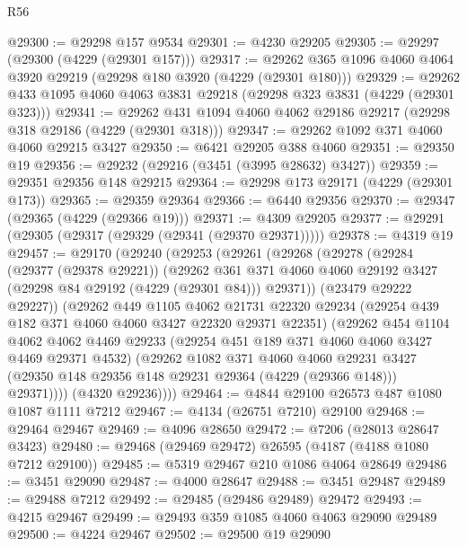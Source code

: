 \begin{lexlean}{R56}
\begin{coremodule}
@29300 := @29298 @157 @9534
@29301 := @4230 @29205
@29305 := @29297 (@29300 (@4229 (@29301 @157)))
@29317 := @29262 @365 @1096 @4060 @4064 @3920 @29219 (@29298 @180 @3920 (@4229 (@29301 @180)))
@29329 := @29262 @433 @1095 @4060 @4063 @3831 @29218 (@29298 @323 @3831 (@4229 (@29301 @323)))
@29341 := @29262 @431 @1094 @4060 @4062 @29186 @29217 (@29298 @318 @29186 (@4229 (@29301 @318)))
@29347 := @29262 @1092 @371 @4060 @4060 @29215 @3427
@29350 := @6421 @29205 @388 @4060
@29351 := @29350 @19
@29356 := @29232 (@29216 (@3451 (@3995 @28632) @3427))
@29359 := @29351 @29356 @148 @29215
@29364 := @29298 @173 @29171 (@4229 (@29301 @173))
@29365 := @29359 @29364
@29366 := @6440 @29356
@29370 := @29347 (@29365 (@4229 (@29366 @19)))
@29371 := @4309 @29205
@29377 := @29291 (@29305 (@29317 (@29329 (@29341 (@29370 @29371)))))
@29378 := @4319 @19
@29457 := @29170
    (@29240
      (@29253
        (@29261
          (@29268
            (@29278
              (@29284
                (@29377 (@29378 @29221))
                (@29262
                  @361
                  @371
                  @4060
                  @4060
                  @29192
                  @3427
                  (@29298 @84 @29192 (@4229 (@29301 @84)))
                  @29371))
              (@23479 @29222 @29227))
            (@29262
              @449
              @1105
              @4062
              @21731
              @22320
              @29234
              (@29254 @439 @182 @371 @4060 @4060 @3427 @22320 @29371 @22351)
              (@29262
                @454
                @1104
                @4062
                @4062
                @4469
                @29233
                (@29254 @451 @189 @371 @4060 @4060 @3427 @4469 @29371 @4532)
                (@29262
                  @1082
                  @371
                  @4060
                  @4060
                  @29231
                  @3427
                  (@29350 @148 @29356 @148 @29231 @29364 (@4229 (@29366 @148)))
                  @29371))))
          (@4320 @29236))))
@29464 := @4844 @29100 @26573 @487 @1080 @1087 @1111 @7212
@29467 := @4134 (@26751 @7210) @29100
@29468 := @29464 @29467
@29469 := @4096 @28650
@29472 := @7206 (@28013 @28647 @3423)
@29480 := @29468 (@29469 @29472) @26595 (@4187 (@4188 @1080 @7212 @29100))
@29485 := @5319 @29467 @210 @1086 @4064 @28649
@29486 := @3451 @29090
@29487 := @4000 @28647
@29488 := @3451 @29487
@29489 := @29488 @7212
@29492 := @29485 (@29486 @29489) @29472
@29493 := @4215 @29467
@29499 := @29493 @359 @1085 @4060 @4063 @29090 @29489
@29500 := @4224 @29467
@29502 := @29500 @19 @29090

\end{coremodule}
\end{lexlean}
